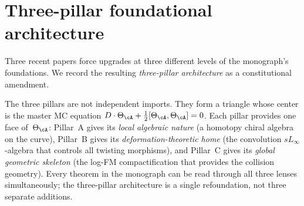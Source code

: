 \section{Three-pillar foundational architecture}
\label{sec:concordance-three-pillars}

Three recent papers force upgrades at three different levels of the
monograph's foundations.  We record the resulting \emph{three-pillar
architecture} as a constitutional amendment.

The three pillars are not independent imports.  They form a triangle
whose center is the master MC equation
$D\cdot\Theta_\cA + \tfrac{1}{2}[\Theta_\cA,\Theta_\cA] = 0$.
Each pillar provides one face of~$\Theta_\cA$: Pillar~A gives its
\emph{local algebraic nature} (a homotopy chiral algebra on the
curve), Pillar~B gives its \emph{deformation-theoretic home} (the
convolution $sL_\infty$-algebra that controls all twisting
morphisms), and Pillar~C gives its \emph{global geometric skeleton}
(the log-FM compactification that provides the collision geometry).
Every theorem in the monograph can be read through all three lenses
simultaneously; the three-pillar architecture is a single
refoundation, not three separate additions.


